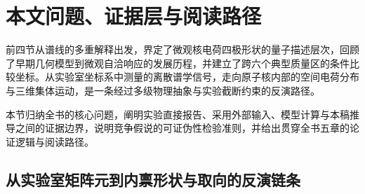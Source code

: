 \section{本文问题、证据层与阅读路径}\label{sec:1-5}

前四节从谱线的多重解释出发，界定了微观核电荷四极形状的量子描述层次，回顾了早期几何模型到微观自洽响应的发展历程，并建立了跨六个典型质量区的条件比较坐标。从实验室坐标系中测量的离散谱学信号，走向原子核内部的空间电荷分布与三维集体运动，是一条经过多级物理抽象与实验截断约束的反演路径。

本节归纳全书的核心问题，阐明实验直接报告、采用外部输入、模型计算与本稿推导之间的证据边界，说明竞争假说的可证伪性检验准则，并给出贯穿全书五章的论证逻辑与阅读路径。

\subsection{从实验室矩阵元到内禀形状与取向的反演链条}\label{sec:1-5-1}

